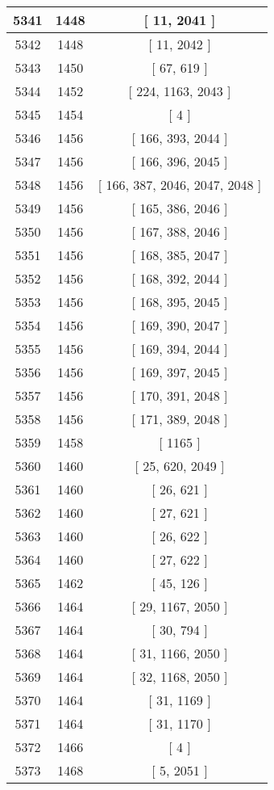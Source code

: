 \begin{center}
\begin{longtable}[H]{|| c c c ||}
\hline
5341 & 1448 & [ 11, 2041 ] \\ 
\hline
5342 & 1448 & [ 11, 2042 ] \\ 
\hline
5343 & 1450 & [ 67, 619 ] \\ 
\hline
5344 & 1452 & [ 224, 1163, 2043 ] \\ 
\hline
5345 & 1454 & [ 4 ] \\ 
\hline
5346 & 1456 & [ 166, 393, 2044 ] \\ 
\hline
5347 & 1456 & [ 166, 396, 2045 ] \\ 
\hline
5348 & 1456 & [ 166, 387, 2046, 2047, 2048 ] \\ 
\hline
5349 & 1456 & [ 165, 386, 2046 ] \\ 
\hline
5350 & 1456 & [ 167, 388, 2046 ] \\ 
\hline
5351 & 1456 & [ 168, 385, 2047 ] \\ 
\hline
5352 & 1456 & [ 168, 392, 2044 ] \\ 
\hline
5353 & 1456 & [ 168, 395, 2045 ] \\ 
\hline
5354 & 1456 & [ 169, 390, 2047 ] \\ 
\hline
5355 & 1456 & [ 169, 394, 2044 ] \\ 
\hline
5356 & 1456 & [ 169, 397, 2045 ] \\ 
\hline
5357 & 1456 & [ 170, 391, 2048 ] \\ 
\hline
5358 & 1456 & [ 171, 389, 2048 ] \\ 
\hline
5359 & 1458 & [ 1165 ] \\ 
\hline
5360 & 1460 & [ 25, 620, 2049 ] \\ 
\hline
5361 & 1460 & [ 26, 621 ] \\ 
\hline
5362 & 1460 & [ 27, 621 ] \\ 
\hline
5363 & 1460 & [ 26, 622 ] \\ 
\hline
5364 & 1460 & [ 27, 622 ] \\ 
\hline
5365 & 1462 & [ 45, 126 ] \\ 
\hline
5366 & 1464 & [ 29, 1167, 2050 ] \\ 
\hline
5367 & 1464 & [ 30, 794 ] \\ 
\hline
5368 & 1464 & [ 31, 1166, 2050 ] \\ 
\hline
5369 & 1464 & [ 32, 1168, 2050 ] \\ 
\hline
5370 & 1464 & [ 31, 1169 ] \\ 
\hline
5371 & 1464 & [ 31, 1170 ] \\ 
\hline
5372 & 1466 & [ 4 ] \\ 
\hline
5373 & 1468 & [ 5, 2051 ] \\ 

\end{longtable}
\end{center}
